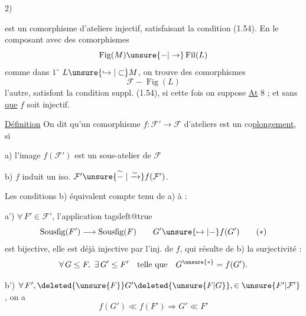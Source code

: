 2)  est un comorphisme d'ateliers injectif, satisfaisant la condition  (1.54). En le composant avec des comorphismes 
\[
\operatorname{Fig}(M)\unsure{-|\to}\operatorname{Fil}(L)
\]
 comme dans $1^\circ$  $L\unsure{\hookrightarrow|\subset}M$, on trouve des comorphismes
\[
\mathcal F-\operatorname{Fig}(L)
\]
 l'autre,  satisfont la condition suppl.  (1.54), si cette fois on suppose \uline{At} 8 ; et sans \uline{que} $f$ soit  injectif.

\uline{Définition} On dit qu'un comorphisme $f:\mathcal F'\to\mathcal F$ d'ateliers est un co\uline{plongement}, si


a) l'image $f(\mathcal F')$ est un sous-atelier de $\mathcal F$ 
\par b) $f$ induit un iso. $\mathcal F'\unsure{\stackrel{\sim}{-}|\xrightarrow{\sim}}f(\mathcal F')$.

 Les conditions  b) équivalent \unsure{(}compte tenu de a) à : \par a') $\forall\,F'\in\mathcal F'$,  l'application
\begingroup\csname tagsleft@true\endcsname
\[
\operatorname{Sousfig}(F')\longrightarrow\operatorname{Sousfig}(F)\qquad G'\unsure{\mapsto|-} f(G')\tag*{$(*)$}
\]
\endgroup
est bijective,   elle est déjà injective par l'inj. de $f$, qui résulte de b) la surjectivité :
\[
\forall\,G\leq F,\ \exists\,G'\leq F'\quad\text{telle que}\quad G^{\unsure{*}}=f(G').
\]

b') $\forall\, F',\deleted{\unsure{F}}G'\deleted{\unsure{F|G}},\in \unsure{F'|\mathcal F'}$, on a
\[
f(G')\ll f(F')\Longrightarrow G'\ll F'
\]

